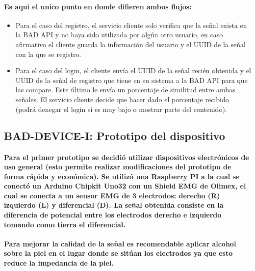 \documentclass{article}
\begin{document}
\paragraph{
Es aqui el unico punto en donde difieren ambos flujos:
}
\begin{itemize}
    \item Para el caso del registro, el servicio cliente solo verifica que la señal exista en la BAD API y no haya sido utilizada por algún otro usuario, en caso afirmativo el cliente guarda la información del usuario y el UUID de la señal con la que se registro.
    \item Para el caso del login, el cliente envía el UUID de la señal recién obtenida y el UUID de la señal de registro que tiene en su sistema a la BAD API para que las compare. Este último le envía un porcentaje de similitud entre ambas señales. El servicio cliente decide que hacer dado el porcentaje recibido (podrá denegar el login si es muy bajo o mostrar parte del contenido).
\end{itemize}


\subsection{BAD-DEVICE-I: Prototipo del dispositivo}
\paragraph{
Para el primer prototipo se decidió utilizar dispositivos electrónicos de uso general (esto permite realizar modificaciones del prototipo de forma rápida y económica). Se utilizó una Raspberry PI a la cual se conectó un Arduino Chipkit Uno32 con un Shield EMG de Olimex, el cual se conecta a un sensor EMG de 3 electrodos: derecho (R) izquierdo (L) y diferencial (D). La señal obtenida consiste en la diferencia de potencial entre los electrodos derecho e izquierdo tomando como tierra el diferencial.
}
\paragraph{
Para mejorar la calidad de la señal es recomendable aplicar alcohol sobre la piel en el lugar donde se sitúan los electrodos ya que esto reduce la impedancia de la piel.
}
\end{document}
